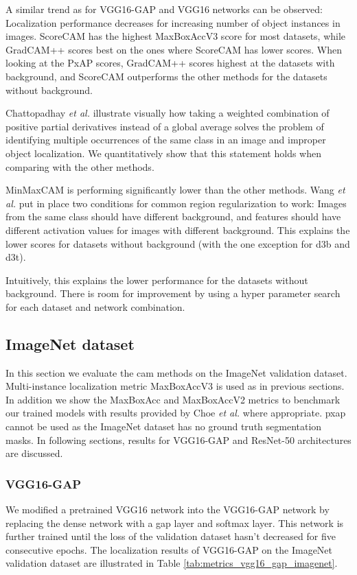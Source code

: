 A similar trend as for VGG16-GAP and VGG16 networks can be observed: Localization performance decreases for increasing number of object instances in images. ScoreCAM has the highest MaxBoxAccV3 score for most datasets, while GradCAM++ scores best on the ones where ScoreCAM has lower scores. When looking at the PxAP scores, GradCAM++ scores highest at the datasets with background, and ScoreCAM outperforms the other methods for the datasets without background.

Chattopadhay \textit{et al.} \cite{chattopadhyay2017grad} illustrate visually how taking a weighted combination of positive partial derivatives instead of a global average solves the problem of identifying multiple occurrences of the same class in an image and improper object localization. We quantitatively show that this statement holds when comparing with the other methods.

MinMaxCAM is performing significantly lower than the other methods. Wang \textit{et al.} \cite{wang2021minmaxcam} put in place two conditions for common region regularization to work: Images from the same class should have different background, and features should have different activation values for images with different background. This explains the lower scores for datasets without background (with the one exception for d3b and d3t).

Intuitively, this explains the lower performance for the datasets without background. There is room for improvement by using a hyper parameter search for each dataset and network combination.

\subsection{ImageNet dataset}
In this section we evaluate the \acrshort{cam} methods on the ImageNet validation dataset. Multi-instance localization metric MaxBoxAccV3 is used as in previous sections. In addition we show the MaxBoxAcc and MaxBoxAccV2 metrics to benchmark our trained models with results provided by Choe \textit{et al.} \cite{choe2020evaluating} where appropriate. \acrfull{pxap} cannot be used as the ImageNet dataset has no ground truth segmentation masks. In following sections, results for VGG16-GAP and ResNet-50 architectures are discussed.

\subsubsection{VGG16-GAP}
We modified a pretrained VGG16 network into the VGG16-GAP network by replacing the dense network with a \acrshort{gap} layer and softmax layer. This network is further trained until the loss of the validation dataset hasn't decreased for five consecutive epochs. The localization results of VGG16-GAP on the ImageNet validation dataset are illustrated in Table \ref{tab:metrics_vgg16_gap_imagenet}.

